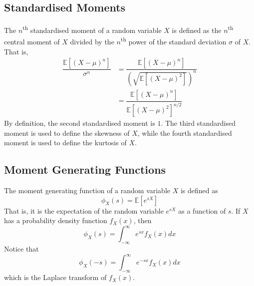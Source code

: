 \documentclass[11pt]{report} %
\begin{document}
\subsection{Standardised Moments}

The $n$\textsuperscript{th} standardised moment of a random variable $X$ is defined as the $n$\textsuperscript{th} central moment of $X$ divided by the $n$\textsuperscript{th} power of the standard deviation $\sigma$ of $X$. That is,
\begin{align}
\dfrac{\mathbb{E}\left[\left(X - \mu\right)^{n}\right]}{\sigma^{n}} &= \dfrac{\mathbb{E}\left[\left(X - \mu\right)^{n}\right]}{\left(\sqrt{\mathbb{E}\left[\left(X - \mu\right)^{2}\right]}\right)^{n}} \\
&= \dfrac{\mathbb{E}\left[\left(X - \mu\right)^{n}\right]}{\mathbb{E}\left[\left(X - \mu\right)^{2}\right]^{n/2}}
\end{align}
By definition, the second standardised moment is $1$. The third standardised moment is used to define the skewness of $X$, while the fourth standardised moment is used to define the kurtosis of $X$.

\subsection{Moment Generating Functions}

The moment generating function of a random variable $X$ is defined as
\begin{equation}
\phi_{X}\left(s\right) = \mathbb{E}\left[e^{sX}\right]
\end{equation}
That is, it is the expectation of the random variable $e^{sX}$ as a function of $s$. If $X$ has a probability density function $f_{X}\left(x\right)$, then
\begin{equation}
\phi_{X}\left(s\right) = \int_{-\infty}^{\infty}e^{sx}f_{X}\left(x\right)dx
\end{equation}
Notice that
\begin{equation}
\phi_{X}\left(-s\right) = \int_{-\infty}^{\infty}e^{-sx}f_{X}\left(x\right)dx
\end{equation}
which is the Laplace transform of $f_{X}\left(x\right)$. \\
\end{document}
